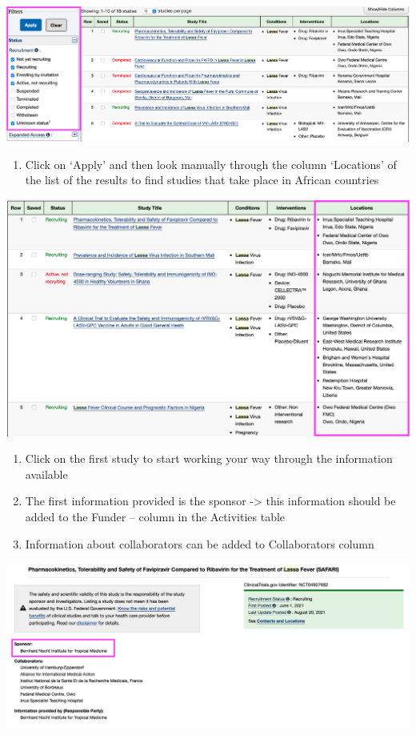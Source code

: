 \documentclass[
]{book}
\providecommand{\tightlist}{%
  \setlength{\itemsep}{0pt}\setlength{\parskip}{0pt}}
\begin{document}
\includegraphics{images/clinicaltrial2.png}

\begin{enumerate}
\def\labelenumi{\arabic{enumi}.}
\setcounter{enumi}{2}
\tightlist
\item
  Click on `Apply' and then look manually through the column `Locations' of the list of the results to find studies that take place in African countries
\end{enumerate}

\includegraphics{images/clinicaltrial3.png}

\begin{enumerate}
\def\labelenumi{\arabic{enumi}.}
\setcounter{enumi}{3}
\item
  Click on the first study to start working your way through the information available
\item
  The first information provided is the sponsor -\textgreater{} this information should be added to the Funder -- column in the Activities table
\item
  Information about collaborators can be added to Collaborators column
\end{enumerate}

\includegraphics{images/clinicaltrial4.png}
\end{document}
